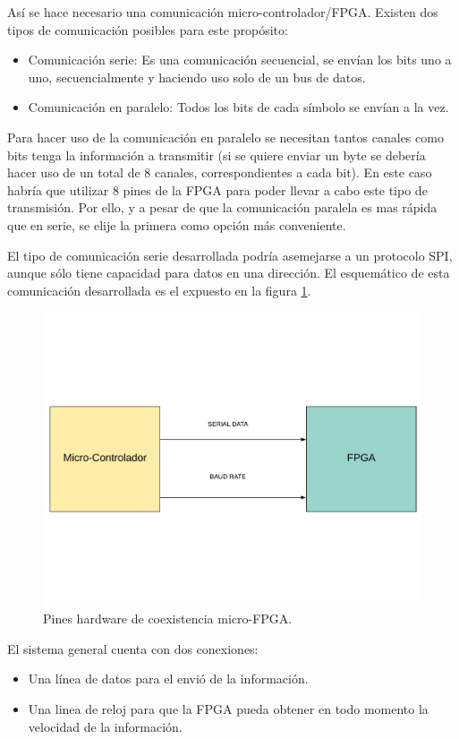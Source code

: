 Así se hace necesario una comunicación micro-controlador/FPGA. Existen dos tipos de comunicación posibles para este propósito: 
\begin{itemize}
	\item Comunicación serie: Es una comunicación secuencial, se envían los bits uno a uno, secuencialmente y haciendo uso solo de un bus de datos.
	\item Comunicación en paralelo: Todos los bits de cada símbolo se envían a la vez.
\end{itemize} 

Para hacer uso de la comunicación en paralelo se necesitan tantos canales como bits tenga la información a transmitir (si se quiere enviar un byte se debería hacer uso de un total de 8 canales, correspondientes a cada bit). En este caso habría que utilizar 8 pines de la FPGA para poder llevar a cabo este tipo de transmisión. Por ello, y a pesar de que la comunicación paralela es mas rápida que en serie, se elije la primera como opción más conveniente. \newline

El tipo de comunicación serie desarrollada podría asemejarse a un protocolo SPI, aunque sólo tiene capacidad para datos en una dirección. El esquemático de esta comunicación desarrollada es el expuesto en la figura \ref{fig:coexistencia2}.

\begin{figure}[H]
	\center
	\includegraphics[trim = 0mm 40mm 0mm 20mm, clip,scale=0.4]{imagenes/Balancing_robot/coexistencia2.pdf}
	\caption{Pines hardware de coexistencia micro-FPGA.}
	\label{fig:coexistencia2}
\end{figure}
El sistema general cuenta con dos conexiones:
\begin{itemize}
	\item Una línea de datos para el envió de la información.
	\item Una linea de reloj para que la FPGA pueda obtener en todo momento la velocidad de la información.
\end{itemize}

